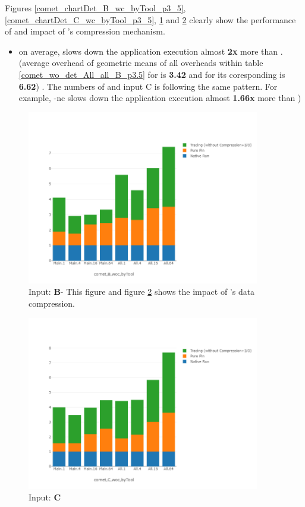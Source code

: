 Figures \ref{comet_chartDet_B_wc_byTool_p3_5}, \ref{comet_chartDet_C_wc_byTool_p3_5}, \ref{comet_chartDet_B_woc_byTool_p3_5} and \ref{comet_chartDet_C_woc_byTool_p3_5} clearly show the performance of \parlot and impact of \parlot 's compression mechanism.
	
\begin{itemize}
\item on average, \parlotnc slows down the application execution almost \textbf{2x} more than \parlota. (average overhead of geometric means of all overheads within table  \ref{comet_wo_det_All_all_B_p3.5} for \parlota is \textbf{3.42} and for its coresponding \parlotnc is \textbf{6.62}) . The numbers of \parlotm and input C is following the same pattern. For example, \parlot-nc slows down the application execution almost \textbf{1.66x} more than \parlotm)
\end{itemize}

\begin{figure}[!t]
\centering
\includegraphics[width=4in]{figs.comet.newMed/comet_chartDet_B_woc_byTool_p3_5.png}
\caption{ Input: \textbf{B}- This figure and figure \ref{comet_chartDet_C_woc_byTool_p3_5} shows the impact of \parlot 's data compression.
}
\label{comet_chartDet_B_woc_byTool_p3_5}
\end{figure}

\begin{figure}[!t]
\centering
\includegraphics[width=4in]{figs.comet.newMed/comet_chartDet_C_woc_byTool_p3_5.png}
\caption{ Input: \textbf{C}
}
\label{comet_chartDet_C_woc_byTool_p3_5}
\end{figure}



